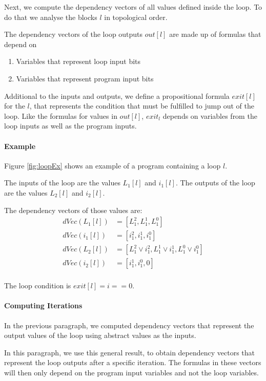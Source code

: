 Next, we compute the dependency vectors of all values defined inside the loop. To do that we analyse the blocks $l$ in topological order.

The dependency vectors of the loop outputs $out[l]$ are made up of formulas that depend on
\begin{enumerate}
    \setlength\itemsep{0em}
    \item Variables that represent loop input bits
    \item Variables that represent program input bits
\end{enumerate}

Additional to the inputs and outputs, we define a propositional formula $exit[l]$ for the $l$, that represents the condition that must be fulfilled to jump out of the loop. Like the formulas for values in $out[l]$, $exit_l$ depends on variables from the loop inputs as well as the program inputs. 

\paragraph{Example}
Figure \ref{fig:loopEx} shows an example of a program containing a loop $l$.

The inputs of the loop are the values $L_1[l]$ and $i_1[l]$. The outputs of the loop are the values $L_2[l]$ and $i_2[l]$.

The dependency vectors of those values are:
\begin{align*}
    dVec(L_1[l]) &= [L_1^2, L_1^1, L_1^0] \\
    dVec(i_1[l]) &= [i_1^2, i_1^1, i_1^0] \\
    dVec(L_2[l]) &= [L_1^2 \lor i_1^2, L_1^1 \lor i_1^1, L_1^0 \lor i_1^0] \\
    dVec(i_2[l]) &= [i_1^1, i_1^0, 0] \\
\end{align*}

The loop condition is $exit[l] = i == 0$.

\paragraph{Computing Iterations}
In the previous paragraph, we computed dependency vectors that represent the output values of the loop using abstract values as the inputs.

In this paragraph, we use this general result, to obtain dependency vectors that represent the loop outputs after a specific iteration. The formulas in these vectors will then only depend on the program input variables and not the loop variables.

